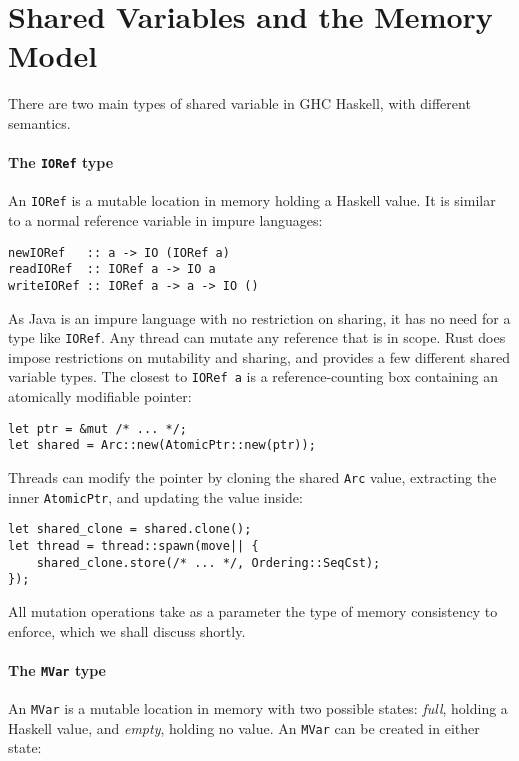 \section{Shared Variables and the Memory Model}
\label{sec:concurrent_haskell-mmodel}

There are two main types of shared variable in GHC Haskell, with different
semantics.

\paragraph{The \texttt{IORef} type}
An \verb|IORef| is a mutable location in memory holding a Haskell
value.  It is similar to a normal reference variable in impure
languages:

\begin{verbatim}
newIORef   :: a -> IO (IORef a)
readIORef  :: IORef a -> IO a
writeIORef :: IORef a -> a -> IO ()
\end{verbatim}

As Java is an impure language with no restriction on sharing, it has
no need for a type like \verb|IORef|.  Any thread can mutate any
reference that is in scope.  Rust does impose restrictions on
mutability and sharing, and provides a few different shared variable
types.  The closest to \verb|IORef a| is a reference-counting box
containing an atomically modifiable pointer:

\begin{verbatim}
let ptr = &mut /* ... */;
let shared = Arc::new(AtomicPtr::new(ptr));
\end{verbatim}

Threads can modify the pointer by cloning the shared \verb|Arc| value,
extracting the inner \verb|AtomicPtr|, and updating the value inside:

\begin{verbatim}
let shared_clone = shared.clone();
let thread = thread::spawn(move|| {
    shared_clone.store(/* ... */, Ordering::SeqCst);
});
\end{verbatim}

All mutation operations take as a parameter the type of memory
consistency to enforce, which we shall discuss shortly.

\paragraph{The \texttt{MVar} type}
An \verb|MVar| is a mutable location in memory with two possible
states: \emph{full}, holding a Haskell value, and \emph{empty},
holding no value.  An \verb|MVar| can be created in either state:

